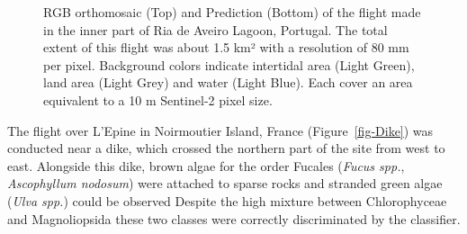 \documentclass[
  number]{elsarticle}
\begin{document}
\label{cell-fig-Boat}
\begin{figure}[H]


\caption{\label{fig-Boat}RGB orthomosaic (Top) and Prediction (Bottom)
of the flight made in the inner part of Ria de Aveiro Lagoon, Portugal.
The total extent of this flight was about 1.5 km² with a resolution of
80 mm per pixel. Background colors indicate intertidal area (Light
Green), land area (Light Grey) and water (Light Blue). Each cover an
area equivalent to a 10 m Sentinel-2 pixel size.}

\end{figure}%

The flight over L'Epine in Noirmoutier Island, France
(Figure~\ref{fig-Dike}) was conducted near a dike, which crossed the
northern part of the site from west to east. Alongside this dike, brown
algae for the order Fucales (\emph{Fucus spp.}, \emph{Ascophyllum
nodosum}) were attached to sparse rocks and stranded green algae
(\emph{Ulva spp.}) could be observed Despite the high mixture between
Chlorophyceae and Magnoliopsida these two classes were correctly
discriminated by the classifier.
\end{document}
